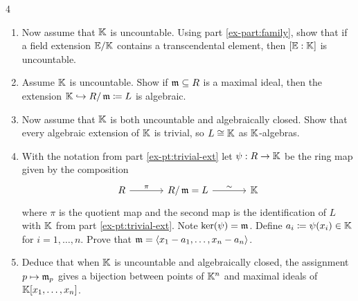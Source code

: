 \documentclass[Notebook.tex]{subfiles}
\begin{document}
\begin{problem}{4}
\begin{enumerate}
        \item Now assume that $\mathbb K$ is uncountable. Using part \ref{ex-part:family}, show that if a field extension $\mathbb E/\mathbb K$ contains a transcendental element, then $[\mathbb E:\mathbb K]$ is uncountable.
        \item Assume $\mathbb K$ is uncountable. Show if $\operatorname{\mathfrak{m}} \subseteq R$ is a maximal ideal, then the extension $\mathbb K \hookrightarrow R/\operatorname{\mathfrak{m}}\coloneqq L$ is algebraic.
        \item\label{ex-pt:trivial-ext} Now assume that $\mathbb K$ is both uncountable and algebraically closed. Show that every algebraic extension of $\mathbb K$ is trivial, so $L\cong \mathbb K$ as $\mathbb K$-algebras.
        \item With the notation from part \ref{ex-pt:trivial-ext} let $\psi:R \to \mathbb K$ be the ring map given by the composition
        \[
        \begin{tikzcd}[row sep = .5em, column sep = 3.5em]
        R \arrow[r,"\pi"] & R/\fm = L \arrow[r,"\sim"] & \K
        \end{tikzcd}
        \]
        where $\pi$ is the quotient map and the second map is the identification of $L$ with $\mathbb K$ from part \ref{ex-pt:trivial-ext}.  Note $\ker(\psi)= \operatorname{\mathfrak{m}}$. Define $a_i\coloneqq \psi(x_i) \in \mathbb K$ for $i=1,\ldots,n$. Prove that $\operatorname{\mathfrak{m}}=\langle x_1-a_1,\ldots,x_n-a_n\rangle$.

        \item Deduce that when $\mathbb K$ is uncountable and algebraically closed, the assignment $p\mapsto \operatorname{\mathfrak{m}}_p$ gives a bijection between points of $\mathbb K^n$ and maximal ideals of $\mathbb K[x_1,\ldots,x_n]$.
        \end{enumerate}
\end{problem}
\end{document}
